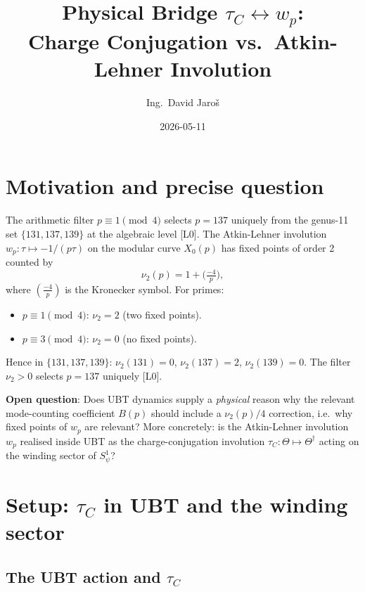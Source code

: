 \documentclass[12pt,a4paper]{article}
\title{Physical Bridge $\tau_C \leftrightarrow w_p$:\\
         Charge Conjugation vs.\ Atkin-Lehner Involution}
\author{Ing.\ David Jaro\v{s}}
\date{2026-05-11}
\begin{document}
  \maketitle
\fi

\section{Motivation and precise question}

The arithmetic filter $p \equiv 1 \pmod{4}$ selects $p = 137$ uniquely from
the genus-11 set $\{131, 137, 139\}$ at the algebraic level [L0].
The Atkin-Lehner involution $w_p : \tau \mapsto -1/(p\tau)$ on the modular
curve $X_0(p)$ has fixed points of order 2 counted by
\begin{equation}
  \nu_2(p) = 1 + \bigl(\tfrac{-4}{p}\bigr),
\end{equation}
where $(\tfrac{-4}{p})$ is the Kronecker symbol.  For primes:
\begin{itemize}
  \item $p \equiv 1 \pmod{4}$: $\nu_2 = 2$ (two fixed points).
  \item $p \equiv 3 \pmod{4}$: $\nu_2 = 0$ (no fixed points).
\end{itemize}

Hence in $\{131, 137, 139\}$: $\nu_2(131)=0$, $\nu_2(137)=2$, $\nu_2(139)=0$.
The filter $\nu_2 > 0$ selects $p = 137$ uniquely [L0].

\textbf{Open question}: Does UBT dynamics supply a \emph{physical} reason
why the relevant mode-counting coefficient $B(p)$ should include a
$\nu_2(p)/4$ correction, i.e.\ why fixed points of $w_p$ are relevant?
More concretely: is the Atkin-Lehner involution $w_p$ realised inside
UBT as the charge-conjugation involution $\tau_C : \Theta \mapsto \Theta^\dagger$
acting on the winding sector of $S^1_\psi$?

\section{Setup: $\tau_C$ in UBT and the winding sector}
\label{sec:setup}

\subsection{The UBT action and $\tau_C$}
\end{document}
